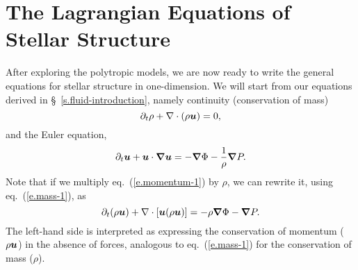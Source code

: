 \chapter[Stellar Structure Equations]{The Lagrangian Equations of Stellar Structure}

After exploring the polytropic models, we are now ready to write the general equations for stellar structure in one-dimension. We will start from our equations derived in \S~\ref{s.fluid-introduction}, namely continuity (conservation of mass)
\begin{equation}\label{e.mass-1}
\partial_{t}\rho + \nabla \cdot(\rho\boldsymbol{u}) = 0,
\end{equation}
and the Euler equation,
\begin{equation}\label{e.momentum-1}
\partial_{t}\boldsymbol{u} + \boldsymbol{u}\cdot\boldsymbol{\nabla}\boldsymbol{u} = -\boldsymbol{\nabla} \Phi - \frac{1}{\rho}\boldsymbol{\nabla} P.
\end{equation}
Note that if we multiply eq.~(\ref{e.momentum-1}) by $\rho$, we can rewrite it, using eq.~(\ref{e.mass-1}), as
\begin{equation}\label{e.momentum-2}
	\partial_{t}(\rho\boldsymbol{u}) + \nabla \cdot[\boldsymbol{u}(\rho\boldsymbol{u})] = -\rho\boldsymbol{\nabla}\Phi -\boldsymbol{\nabla} P.
\end{equation}
The left-hand side is interpreted as expressing the conservation of momentum ($\rho\boldsymbol{u}$) in the absence of forces, analogous to eq.~(\ref{e.mass-1}) for the conservation of mass ($\rho$).

